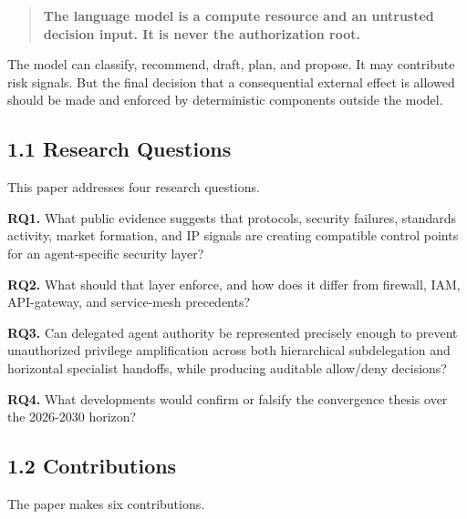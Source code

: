 \documentclass[
  10pt,
  letterpaper,
]{article}
\begin{document}
\begin{quote}
\textbf{The language model is a compute resource and an untrusted
decision input. It is never the authorization root.}
\end{quote}

The model can classify, recommend, draft, plan, and propose. It may
contribute risk signals. But the final decision that a consequential
external effect is allowed should be made and enforced by deterministic
components outside the model.

\subsection{1.1 Research Questions}\label{research-questions}

This paper addresses four research questions.

\textbf{RQ1.} What public evidence suggests that protocols, security
failures, standards activity, market formation, and IP signals are
creating compatible control points for an agent-specific security layer?

\textbf{RQ2.} What should that layer enforce, and how does it differ
from firewall, IAM, API-gateway, and service-mesh precedents?

\textbf{RQ3.} Can delegated agent authority be represented precisely
enough to prevent unauthorized privilege amplification across both
hierarchical subdelegation and horizontal specialist handoffs, while
producing auditable allow/deny decisions?

\textbf{RQ4.} What developments would confirm or falsify the convergence
thesis over the 2026-2030 horizon?

\subsection{1.2 Contributions}\label{contributions}

The paper makes six contributions.
\end{document}
